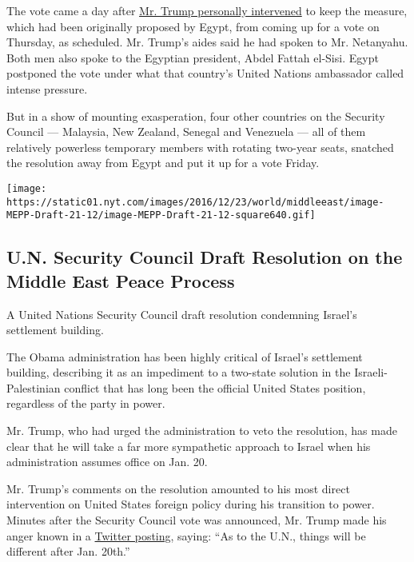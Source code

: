 The vote came a day after
\href{https://www.nytimes.com/2016/12/22/world/middleeast/donald-trump-united-nations-israel-settlements.html}{Mr.
Trump personally intervened} to keep the measure, which had been
originally proposed by Egypt, from coming up for a vote on Thursday, as
scheduled. Mr. Trump's aides said he had spoken to Mr. Netanyahu. Both
men also spoke to the Egyptian president, Abdel Fattah el-Sisi. Egypt
postponed the vote under what that country's United Nations ambassador
called intense pressure.

But in a show of mounting exasperation, four other countries on the
Security Council --- Malaysia, New Zealand, Senegal and Venezuela ---
all of them relatively powerless temporary members with rotating
two-year seats, snatched the resolution away from Egypt and put it up
for a vote Friday.

\href{https://www.nytimes.com/interactive/2016/12/23/world/middleeast/document-security-council-draft-resolution-israel.html}{}

\texttt{[image: https://static01.nyt.com/images/2016/12/23/world/middleeast/image-MEPP-Draft-21-12/image-MEPP-Draft-21-12-square640.gif]}

\hypertarget{un-security-council-draft-resolution-on-the-middle-east-peace-process}{%
\subsection{U.N. Security Council Draft Resolution on the Middle East
Peace
Process}\label{un-security-council-draft-resolution-on-the-middle-east-peace-process}}

A United Nations Security Council draft resolution condemning Israel's
settlement building.

The Obama administration has been highly critical of Israel's settlement
building, describing it as an impediment to a two-state solution in the
Israeli-Palestinian conflict that has long been the official United
States position, regardless of the party in power.

Mr. Trump, who had urged the administration to veto the resolution, has
made clear that he will take a far more sympathetic approach to Israel
when his administration assumes office on Jan. 20.

Mr. Trump's comments on the resolution amounted to his most direct
intervention on United States foreign policy during his transition to
power. Minutes after the Security Council vote was announced, Mr. Trump
made his anger known in a
\href{https://twitter.com/realDonaldTrump/status/812390964740427776}{Twitter
posting}, saying: ``As to the U.N., things will be different after Jan.
20th.''

